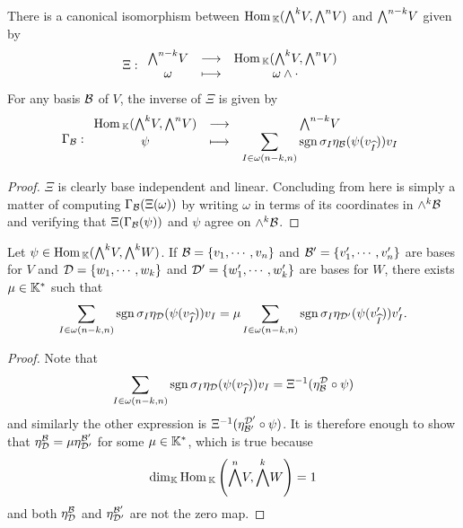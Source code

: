 \begin{proposition}\label{CanonicalIso}
There is a canonical isomorphism between $\Hom_\K(\bw V,\bw[n]V)$ and $\bw[n-k]V$ given by
\[\Xi:\funcDef{\bw[n-k]V}{\Hom_\K(\bw V, \bw[n]V)}{\omega}{\omega\wedge \cdot}\]
For any basis $\mathcal{B}$ of $V$, the inverse of $\Xi$ is given by 
\[\Gamma_\Bc:\funcDef{\Hom_\K(\bw V,\bw[n]V)}{\bw[n-k]V}{\psi}{\displaystyle \sum_{I\in\omega(n-k,n)}\sgn\sigma_I\eta_\Bc(\psi(v_{\wh I}))v_I}\]
\end{proposition}
\begin{proof}
$\Xi$ is clearly base independent and linear. Concluding from here is simply a matter of computing $\Gamma_{\mathcal{B}}(\Xi(\omega))$ by writing $\omega$ in terms of its coordinates in $\wedge^k\mathcal{B}$ and verifying that $\Xi(\Gamma_{\mathcal{B}}(\psi))$ and $\psi$ agree on $\wedge^k\mathcal{B}$.
\end{proof}
\begin{corollary}\label{UpToScalarCanonicalIso}
Let $\psi\in \Hom_\K(\bw V,\bw W)$. If $\mathcal{B}=\left\{{v_1,\cdots, v_n}\right\}$ and $\mathcal{B}'=\left\{{v_1',\cdots, v_n'}\right\}$ are bases for $V$ and $\mathcal{D}=\left\{{w_1,\cdots,w_k}\right\}$ and $\mathcal{D}'=\left\{{w_1',\cdots,w_k'}\right\}$ are bases for $W$, there exists $\mu\in\mathbb{K}^\ast$ such that
\[\sum_{I\in\omega(n-k,n)}\mathrm{sgn}\,\sigma_I\eta_{\mathcal{D}}(\psi(v_{\widehat{I}}))v_I=\mu \sum_{I\in\omega(n-k,n)}\mathrm{sgn}\,\sigma_I\eta_{\mathcal{D}'}(\psi(v'_{\widehat{I}}))v'_I.\]
\end{corollary}
\begin{proof}
Note that
\[\sum_{I\in\omega(n-k,n)}\mathrm{sgn}\,\sigma_I\eta_{\mathcal{D}}(\psi(v_{\widehat{I}}))v_I=\Xi^{-1}(\eta^{\mathcal{D}}_{\mathcal{B}}\circ \psi)\]
and similarly the other expression is $\Xi^{-1}(\eta^{\mathcal{D}'}_{\mathcal{B}'}\circ \psi)$. 
It is therefore enough to show that $\eta^{\mathcal{B}}_{\mathcal{D}}=\mu\eta^{\mathcal{B}'}_{\mathcal{D}'}$ for some $\mu\in \mathbb{K}^\ast$, which is true because 
\[\dim_\K\Hom_\K\pa{\bw[n]V,\bw W}=1\] 
and both $\eta^{\mathcal{B}}_{\mathcal{D}}$ and $\eta^{\mathcal{B}'}_{\mathcal{D}'}$ are not the zero map.
\end{proof}





